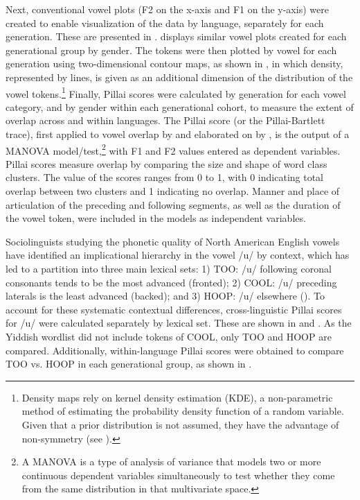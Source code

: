 \documentclass[output=paper]{langsci/langscibook}
\begin{document}
\largerpage
Next, conventional vowel plots (F2 on the x-axis and F1 on the y-axis) were created to enable visualization of the data by language, separately for each generation. These are presented in .  displays similar vowel plots created for each generational group by gender. The tokens were then plotted by vowel for each generation using two-dimensional contour maps, as shown in , in which density, represented by lines, is given as an additional dimension of the distribution of the vowel tokens.\footnote{Density maps rely on kernel density estimation (KDE), a non-parametric method of estimating the probability density function of a random variable. Given that a prior distribution is not assumed, they have the advantage of non-symmetry (see \citealt{NyczHall-Lew2013}).} Finally, Pillai scores were calculated by generation for each vowel category, and by gender within each generational cohort, to measure the extent of overlap across and within languages. The Pillai score (or the Pillai-Bartlett trace), first applied to vowel overlap by \citet{HayEtAl2006} and elaborated on by \citet{NyczHall-Lew2013}, is the output of a MANOVA model/test,\footnote{A MANOVA is a type of analysis of variance that models two or more continuous dependent variables simultaneously to test whether they come from the same distribution in that multivariate space.} with F1 and F2 values entered as dependent variables. Pillai scores measure overlap by comparing the size and shape of word class clusters. The value of the scores ranges from 0 to 1, with 0 indicating total overlap between two clusters and 1 indicating no overlap. Manner and place of articulation of the preceding and following segments, as well as the duration of the vowel token, were included in the models as independent variables.

Sociolinguists studying the phonetic quality of North American English vowels have identified an implicational hierarchy in the vowel /u/ by context, which has led to a partition into three main lexical sets: 1) TOO: /u/ following coronal consonants tends to be the most advanced (fronted); 2) COOL: /u/ preceding laterals is the least advanced (backed); and 3) HOOP: /u/ elsewhere (\citealt{Baranowski2008, Hall-Lew2009, LabovEtAl2005}). To account for these systematic contextual differences, cross-linguistic Pillai scores for /u/ were calculated separately by lexical set. These are shown in  and . As the Yiddish wordlist did not include tokens of COOL, only TOO and HOOP are compared. Additionally, within-language Pillai scores were obtained to compare TOO vs. HOOP in each generational group, as shown in . 
\end{document}
